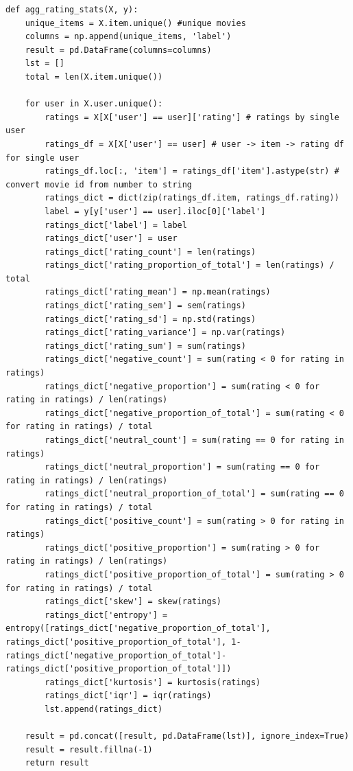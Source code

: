 \documentclass[12pt]{article}
\begin{document}
\label{code:1}\begin{lstlisting}[caption={Feature Engineering function}]
def agg_rating_stats(X, y):
    unique_items = X.item.unique() #unique movies
    columns = np.append(unique_items, 'label')
    result = pd.DataFrame(columns=columns)
    lst = []
    total = len(X.item.unique())

    for user in X.user.unique():
        ratings = X[X['user'] == user]['rating'] # ratings by single user
        ratings_df = X[X['user'] == user] # user -> item -> rating df for single user
        ratings_df.loc[:, 'item'] = ratings_df['item'].astype(str) # convert movie id from number to string
        ratings_dict = dict(zip(ratings_df.item, ratings_df.rating))
        label = y[y['user'] == user].iloc[0]['label']
        ratings_dict['label'] = label
        ratings_dict['user'] = user
        ratings_dict['rating_count'] = len(ratings)
        ratings_dict['rating_proportion_of_total'] = len(ratings) / total
        ratings_dict['rating_mean'] = np.mean(ratings)
        ratings_dict['rating_sem'] = sem(ratings)
        ratings_dict['rating_sd'] = np.std(ratings)
        ratings_dict['rating_variance'] = np.var(ratings)
        ratings_dict['rating_sum'] = sum(ratings)
        ratings_dict['negative_count'] = sum(rating < 0 for rating in ratings)
        ratings_dict['negative_proportion'] = sum(rating < 0 for rating in ratings) / len(ratings)
        ratings_dict['negative_proportion_of_total'] = sum(rating < 0 for rating in ratings) / total
        ratings_dict['neutral_count'] = sum(rating == 0 for rating in ratings)
        ratings_dict['neutral_proportion'] = sum(rating == 0 for rating in ratings) / len(ratings)
        ratings_dict['neutral_proportion_of_total'] = sum(rating == 0 for rating in ratings) / total
        ratings_dict['positive_count'] = sum(rating > 0 for rating in ratings)
        ratings_dict['positive_proportion'] = sum(rating > 0 for rating in ratings) / len(ratings)
        ratings_dict['positive_proportion_of_total'] = sum(rating > 0 for rating in ratings) / total
        ratings_dict['skew'] = skew(ratings)
        ratings_dict['entropy'] = entropy([ratings_dict['negative_proportion_of_total'], ratings_dict['positive_proportion_of_total'], 1-ratings_dict['negative_proportion_of_total']- ratings_dict['positive_proportion_of_total']])
        ratings_dict['kurtosis'] = kurtosis(ratings)
        ratings_dict['iqr'] = iqr(ratings)
        lst.append(ratings_dict)

    result = pd.concat([result, pd.DataFrame(lst)], ignore_index=True)
    result = result.fillna(-1)
    return result
\end{lstlisting}
\end{document}
